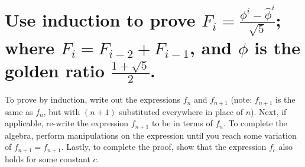 \section[Problem 2]{Use induction to prove $F_i = \frac{\phi^i - \hat{\phi}^i}{\sqrt{5}}$; where $F_i = F_{i-2} + F_{i-1}$, and $\phi$ is the golden ratio $\frac{1 + \sqrt{5}}{2}$.}

To prove by induction, write out the expressions $f_n$ and $f_{n + 1}$ (note: $f_{n + 1}$ is the same as $f_n$, but with $(n + 1)$ substituted everywhere in place of $n$). Next, if applicable, re-write the expression $f_{n + 1}$ to be in terms of $f_n$. To complete the algebra, perform manipulations on the expression until you reach some variation of $f_{n + 1} = f_{n + 1}$.  Lastly, to complete the proof, show that the expression $f_c$ also holds for some constant $c$. 

